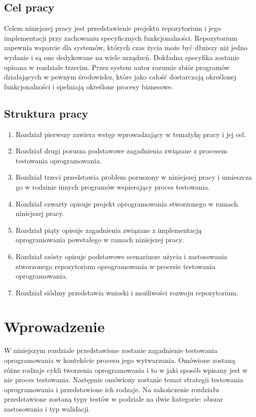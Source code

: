 \section{Cel pracy}
Celem niniejszej pracy jest przedstawienie projektu repozytorium i jego implementacji przy zachowaniu specyficznych funkcjonalności. Repozytorium zapewnia wsparcie dla systemów, których czas życia może być dłuższy niż jedno wydanie i są one dedykowane na wiele urządzeń. Dokładna specyfika zostanie opisana w rozdziale trzecim. Przez system autor rozumie zbiór programów działających w pewnym środowisku, które jako całość dostarczają określonej funkcjonalności i spełniają określone procesy biznesowe. 
\section{Struktura pracy}
\begin{enumerate}
  \item Rozdział pierwszy zawiera wstęp wprowadzający w tematykę pracy i jej  cel.
  \item Rozdział drugi porusza podstawowe zagadnienia związane z procesem testowania oprogramowania.
  \item Rozdział trzeci przedstawia problem poruszony w niniejszej pracy i umieszcza go w rodzinie innych programów wspierający proces testowania.
  \item Rozdział czwarty opisuje projekt oprogramowania stworzonego w ramach niniejszej pracy.
  \item Rozdział piąty opisuje zagadnienia związane z implementacją oprogramowania powstałego w ramach niniejszej pracy.
  \item Rozdział szósty opisuje podstawowe scenariusze użycia i zastosowania stworzonego repozytorium oprogramowania w procesie testowania oprogramowania.
  \item Rozdział siódmy przedstawia wnioski i możliwości rozwoju repozytorium.
\end{enumerate}


\chapter{Wprowadzenie}
W niniejszym rozdziale przedstawione zostanie zagadnienie testowania oprogramowania w kontekście procesu jego wytwarzania. Omówione zostaną różne rodzaje cykli tworzenia oprogramowania i to w jaki sposób wpisany jest w nie proces testowania. Następnie omówiony zostanie temat strategii testowania oprogramowania i przedstawione ich rodzaje. Na zakończenie rozdziału przedstawione zostaną typy testów w podziale na dwie kategorie: obszar zastosowania i typ walidacji.
